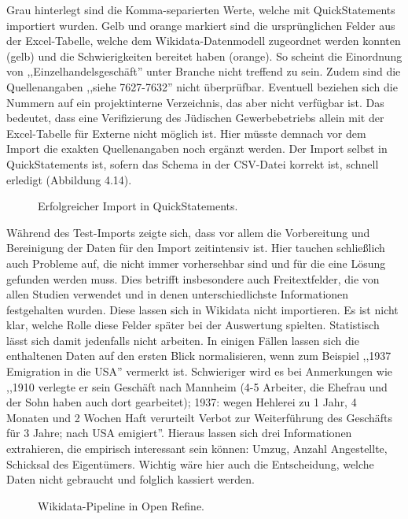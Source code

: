 Grau hinterlegt sind die Komma-separierten Werte, welche mit QuickStatements importiert wurden. Gelb und orange markiert sind die ursprünglichen Felder aus der Excel-Tabelle, welche dem Wikidata-Datenmodell zugeordnet werden konnten (gelb) und die Schwierigkeiten bereitet haben (orange). So scheint die Einordnung von ,,Einzelhandelsgeschäft'' unter Branche nicht treffend zu sein. Zudem sind die Quellenangaben ,,siehe 7627-7632'' nicht überprüfbar. Eventuell beziehen sich die Nummern auf ein projektinterne Verzeichnis, das aber nicht verfügbar ist. Das bedeutet, dass eine Verifizierung des Jüdischen Gewerbebetriebs allein mit der Excel-Tabelle für Externe nicht möglich ist. Hier müsste demnach vor dem Import die exakten Quellenangaben noch ergänzt werden. Der Import selbst in QuickStatements ist, sofern das Schema in der CSV-Datei korrekt ist, schnell erledigt (Abbildung 4.14).

\begin{figure}[h]
    \centering
    \caption{Erfolgreicher Import in QuickStatements.}
    \label{fig:x cubed graph}
\end{figure}

Während des Test-Imports zeigte sich, dass vor allem die Vorbereitung und Bereinigung der Daten für den Import zeitintensiv ist. Hier tauchen schließlich auch Probleme auf, die nicht immer vorhersehbar sind und für die eine Lösung gefunden werden muss. Dies betrifft insbesondere auch Freitextfelder, die von allen Studien verwendet und in denen unterschiedlichste Informationen festgehalten wurden. Diese lassen sich in Wikidata nicht importieren. Es ist nicht klar, welche Rolle diese Felder später bei der Auswertung spielten. Statistisch lässt sich damit jedenfalls nicht arbeiten. In einigen Fällen lassen sich die enthaltenen Daten auf den ersten Blick normalisieren, wenn zum Beispiel ,,1937 Emigration in die USA'' vermerkt ist. Schwieriger wird es bei Anmerkungen wie ,,1910 verlegte er sein Geschäft nach Mannheim (4-5 Arbeiter, die Ehefrau und der Sohn haben auch dort gearbeitet); 1937: wegen Hehlerei zu 1 Jahr, 4 Monaten und 2 Wochen Haft verurteilt Verbot zur Weiterführung des Geschäfts für 3 Jahre; nach USA emigiert''. Hieraus lassen sich drei Informationen extrahieren, die empirisch interessant sein können: Umzug, Anzahl Angestellte, Schicksal des Eigentümers. Wichtig wäre hier auch die Entscheidung, welche Daten nicht gebraucht und folglich kassiert werden.

\begin{figure}[h]
    \centering
    \caption{Wikidata-Pipeline in Open Refine.}
    \label{fig:x cubed graph}
\end{figure}

